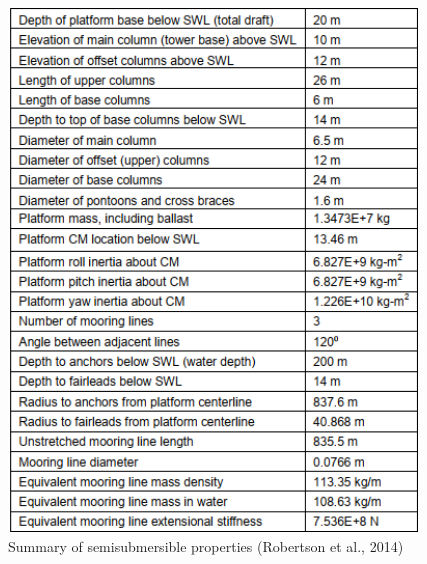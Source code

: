 \documentclass[a4paper, 11pt]{article}
\begin{document}
\begin{figure}[htbp]
\begin{minipage}{0.47\textwidth}
        \label{fig:OC4}
    \end{minipage}
    \hfill
    \begin{minipage}{0.5\textwidth}
        \centering
        \includegraphics[width=0.97\textwidth]{characteristics.png}
        \caption{\small Summary of semisubmersible properties (Robertson et al., 2014)}
        \label{fig:characteristics}
    \end{minipage}
\end{figure}
\end{document}
